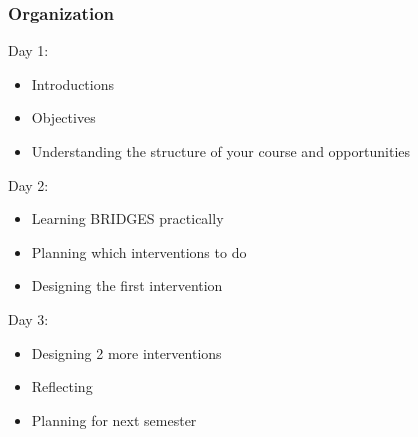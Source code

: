 \documentclass[aspectratio=169]{beamer}
\begin{document}
\begin{frame}
  \frametitle{Organization}

  Day 1:
  \begin{itemize}
  \item Introductions
  \item Objectives
  \item Understanding the structure of your course and opportunities
  \end{itemize}
  
  Day 2:
  \begin{itemize}
  \item Learning BRIDGES practically
  \item Planning which interventions to do
  \item Designing the first intervention
  \end{itemize}

  
  Day 3:
  \begin{itemize}
  \item Designing 2 more interventions
  \item Reflecting
  \item Planning for next semester
  \end{itemize}
  
\end{frame}
\end{document}

